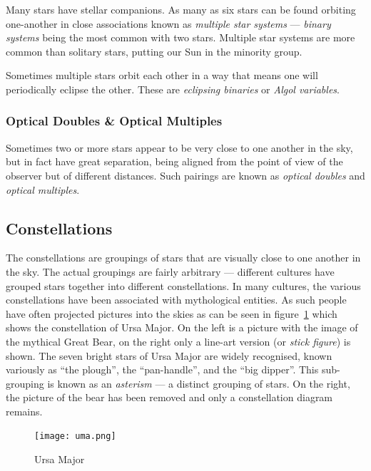 Many stars have stellar companions. As many as six stars can be found
orbiting one-another in close associations known as
\emph{multiple star systems} --- \emph{binary systems} being the most
common with two stars. Multiple star systems are more common than
solitary stars, putting our Sun in the minority group.

Sometimes multiple stars orbit each other in a way that means one will
periodically eclipse the other. These are \emph{eclipsing binaries} or
\emph{Algol variables}.

\subsubsection{Optical Doubles \& Optical Multiples}
\label{sec:Phenomena:multipleStars:optical}

Sometimes two or more stars appear to be very close to one another in
the sky, but in fact have great separation, being aligned from the point
of view of the observer but of different distances. Such pairings are
known as \emph{optical doubles} and \emph{optical multiples}.

\subsection{Constellations}
\label{sec:Phenomena:Constellations}

The constellations are groupings of stars that are visually close to one
another in the sky. The actual groupings are fairly arbitrary ---
different cultures have grouped stars together into different
constellations. In many cultures, the various constellations have been
associated with mythological entities. As such people have often
projected pictures into the skies as can be seen in figure~\ref{fig:ursamajor} which shows the constellation of Ursa Major. On the
left is a picture with the image of the mythical Great Bear, on the
right only a line-art version (or \emph{stick figure}) is shown. The seven bright stars of Ursa
Major are widely recognised, known variously as ``the plough'', the
``pan-handle'', and the ``big dipper''. This sub-grouping is known as an
\emph{asterism} --- a distinct grouping of stars. On the right, the
picture of the bear has been removed and only a constellation diagram
remains.

\begin{figure}[tbp]
\centering\texttt{[image: uma.png]}
\caption{Ursa Major}
\label{fig:ursamajor}
\end{figure}


